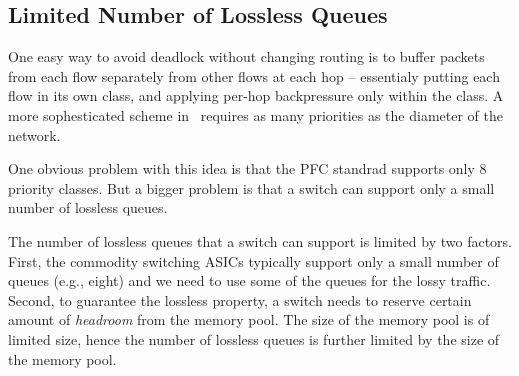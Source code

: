 

\subsection{Limited Number of Lossless Queues}
\label{subsec:pfcheadroom}

One easy way to avoid deadlock without changing routing is to buffer packets
from each flow separately from other flows at each hop -- essentialy putting
each flow in its own class, and applying per-hop backpressure only within the
class.  A more sophesticated scheme in~\cite{karol2003prevention} requires as
many priorities as the diameter of the network. 

One obvious problem with this idea is that the PFC standrad supports only 8
priority classes. But a bigger problem is that a switch can support only a small
number of lossless queues.

The number of lossless queues that a switch can support is limited by two
factors. First, the commodity switching ASICs typically support only a small
number of queues (e.g., eight) and we need to use some of the queues for the
lossy traffic. Second, to guarantee the lossless property, a switch needs to
reserve certain amount of {\it headroom} from the memory pool. The size of the
memory pool is of limited size, hence the number of lossless queues is further
limited by the size of the memory pool.

